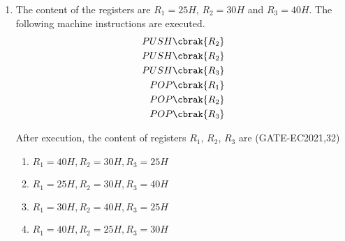 \begin{enumerate}
\item The content of the registers are $R_1 = 25H$, $R_2 = 30H$ and $R_3 = 40H$. The following machine instructions are executed.
\begin{align*}
  PUSH \cbrak {R_2}  
  \\PUSH \cbrak {R_2}
  \\PUSH \cbrak {R_3} 
  \\POP \cbrak {R_1} 
  \\POP \cbrak {R_2} 
  \\POP \cbrak {R_3} 
\end{align*}

After execution, the content of registers $R_1$, $R_2$, $R_3$ are
\hfill(GATE-EC2021,32)

\begin{enumerate}
    \item $R_1 = 40H, R_2 = 30H,R_3 = 25H$
    \item $R_1 = 25H, R_2 = 30H,R_3 = 40H$
    \item $R_1 = 30H, R_2 = 40H,R_3 = 25H$
    \item $R_1 = 40H, R_2 = 25H,R_3 = 30H$
\end{enumerate}

\end{enumerate}
